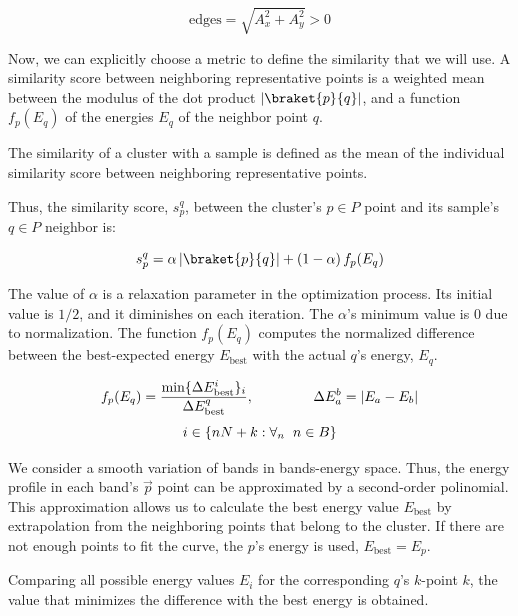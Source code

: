 \documentclass[a4paper,12pt]{report}
\begin{document}
\begin{appendices}
\begin{equation}
    \text{edges} = \sqrt{A_x^2+A_y^2} > 0
\end{equation}

Now, we can explicitly choose a metric to define the similarity that we will use.
A similarity score between neighboring representative points is a weighted mean between the modulus of the dot product $\left|\braket{p}{q}\right|$, and a function $f_p(E_q)$ of the energies $E_q$ of the neighbor point $q$.

The similarity of a cluster with a sample is defined as the mean of the individual similarity score between neighboring representative points.

Thus, the similarity score, $s_p^q$, between the cluster's $p\in P$ point and its sample's $q \in P$ neighbor is:

\begin{equation}
    s_p^q = \alpha\left|\braket{p}{q}\right| + \left(1-\alpha\right)f_p(E_q)
\end{equation}

The value of $\alpha$ is a relaxation parameter in the optimization process.
Its initial value is $1/2$, and it diminishes on each iteration.
The $\alpha$'s minimum value is $0$ due to normalization.
The function $f_p(E_q)$ computes the normalized difference between the best-expected energy $E_{\text{best}}$ with the actual $q$'s energy, $E_q$.

\begin{equation}
    f_p(E_q) = \frac{\text{min}\{\Delta E_\text{best}^{i}\}_i}{\Delta E_\text{best}^q},\hspace{1.5cm} \Delta E_a^b = |E_a-E_b|
\end{equation}
\begin{equation}
    i \in \left\{n N + k: \forall_n\hspace{0.2cm}n\in B\right\}
\end{equation}

We consider a smooth variation of bands in bands-energy space. Thus, the energy profile in each band's $\vec{p}$ point can be approximated by a second-order polinomial. This approximation allows us to calculate the best energy value $E_\text{best}$ by extrapolation from the neighboring points that belong to the cluster.
If there are not enough points to fit the curve, the $p$'s energy is used,  $E_\text{best}=E_p$.

Comparing all possible energy values $E_i$ for the corresponding $q$'s $k$-point $k$, the value that minimizes the difference with the best energy is obtained.





\end{appendices}
\end{document}
